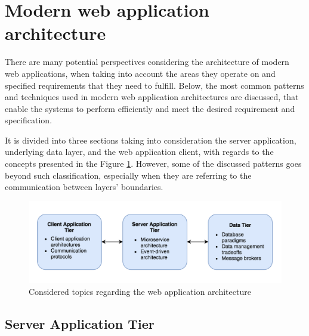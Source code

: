 
\section{Modern web application architecture} \label{section:web-apps-modern-web-application-architecture}

There are many potential perspectives considering the architecture of modern web applications, when taking into account the areas they operate on and specified requirements that they need to fulfill. Below, the most common patterns and techniques used in modern web application architectures are discussed, that enable the systems to perform efficiently and meet the desired requirement and specification. 

It is divided into three sections taking into consideration the server application, underlying data layer, and the web application client, with regards to the concepts presented in the Figure \ref{fig:web-app-architecture-concepts}. However, some of the discussed patterns goes beyond such classification, especially when they are referring to the communication between layers' boundaries.

\begin{figure}[h]
    \centering
    \includegraphics[width=1\textwidth]{assets/03-web-applications/WebAppLayers.png}
    \caption{Considered topics regarding the web application architecture}
    \label{fig:web-app-architecture-concepts}
\end{figure}

\subsection{Server Application Tier}

